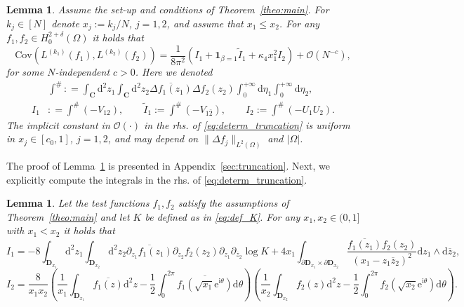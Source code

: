 \documentclass[10pt]{amsart}
\newtheorem{lemma}[theorem]{Lemma}
\numberwithin{equation}{section}
\newcommand{\dif}{\mathrm{d}}
\newcommand{\C}{\mathbf{C}}
\newcommand{\DD}{\mathbf{D}}
\newcommand{\Cov}{\mathrm{Cov}}
\newcommand{\ii}{\mathrm{i}}
\newcommand{\ee}{\mathrm{e}}
\begin{document}
\begin{lemma}\label{lem:determ_truncation} Assume the set-up and conditions of Theorem~\ref{theo:main}. For $k_j\in[N]$ denote $x_j:=k_j/N$, $j=1,2$, and assume that $x_1\le x_2$. For any $f_1,f_2\in H^{2+\delta}_0(\Omega)$ it holds that
\begin{equation}
\Cov \left(L^{(k_1)}(f_1), L^{(k_2)}(f_2)\right) = \frac{1}{8\pi^2}\left(I_1+\bm{1}_{\beta=1}\widetilde{I}_1 +\kappa_4 x_1^2 I_2\right)+\mathcal{O}\left(N^{-c}\right),
\label{eq:determ_truncation}
\end{equation}
for some $N$-independent $c>0$. Here we denoted
\begin{equation}
\begin{split}
&\int^\#: =   \int_\C\!\!\dif^2 z_1\!\!\int_\C\!\!\dif^2 z_2 \overline{\Delta f_1(z_1)}\Delta f_2(z_2)\int_0^{+\infty}\!\!\!\dif\eta_1 \!\!\int_0^{+\infty}\dif\eta_2,\\
I_1&: = \int^\#(-V_{12}), \qquad \widetilde{I}_1:= \int^\#(-V_{1\bar 2}),\qquad I_2:=\int^\# (-U_1U_2).
\end{split}
\end{equation}
The implicit constant in $\mathcal{O}(\cdot)$ in the rhs. of \eqref{eq:determ_truncation} is uniform in $x_j\in [c_0,1]$, $j=1,2$, and may depend on $\|\Delta f_j\|_{L^2(\Omega)}$ and $|\Omega|$.
\end{lemma}

The proof of Lemma~\ref{lem:determ_truncation} is presented in Appendix~\ref{sec:truncation}. Next, we explicitly compute the integrals in the rhs. of \eqref{eq:determ_truncation}.

\begin{lemma}\label{lem:UV_int} Let the test functions $f_1,f_2$ satisfy the assumptions of Theorem~\ref{theo:main} and let $K$ be defined as in \eqref{eq:def_K}. For any $x_1,x_2\in (0,1]$ with $x_1<x_2$ it holds that
\begin{equation}
I_1= -8\int_{\DD_{x_1}}\dif^2 z_1\int_{\DD_{x_2}}\dif^2 z_2\overline{\partial_{z_1}f_1(z_1)}\partial_{z_2}f_2(z_2)\partial_{z_1}\partial_{\overline{z}_2}\log K +4x_1\!\!\int_{\partial\DD_{x_1}\times \partial \DD_{x_2}} \frac{\overline{f_1(z_1)}f_2(z_2)}{(x_1-z_1\overline{z}_2)^2}\dif z_1\wedge \dif\overline{z}_2,\label{eq:V_int}
\end{equation}
\begin{equation}
I_2=\frac{8}{x_1x_2}\left(\frac{1}{x_1}\int_{\DD_{x_1}}\overline{f_1(z)}\dif^2 z-\frac{1}{2}\int_0^{2\pi}\overline{f_1(\sqrt{x_1}\ee^{\ii\theta})}\dif\theta\right)\!\!\left(\frac{1}{x_2}\int_{\DD_{x_2}}f_2(z)\dif^2 z-\frac{1}{2}\int_0^{2\pi}f_2(\sqrt{x_2}\ee^{\ii\theta})\dif\theta\right)\!.\label{eq:U_int}
\end{equation}
\end{lemma}
\end{document}
